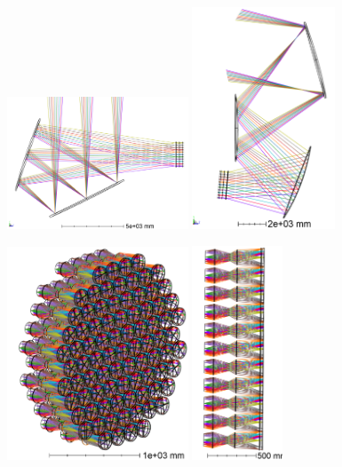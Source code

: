 \documentclass{article}
\begin{document}
\begin{figure}

	\includegraphics[width=0.48\textwidth]{CD_3DLayout_colored.png}
	\includegraphics[width=0.38\textwidth]{TMP_3DLayout_colored.png}
	
	\includegraphics[width=0.48\textwidth]{TMP_cams.PNG}
	\includegraphics[width=0.24\textwidth]{TMP_cam1_layout_allcams.PNG}	
	

\end{figure}
\end{document}
